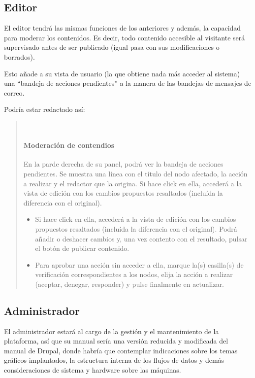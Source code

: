 \subsection{Editor}
\par El editor tendrá las mismas funciones de los anteriores y además, la capacidad para moderar los contenidos. Es decir, todo contenido accesible al visitante será supervisado antes de ser publicado (igual pasa con sus modificaciones o borrados).
\par Esto añade a su vista de usuario (la que obtiene nada más acceder al sistema) una ``bandeja de acciones pendientes'' a la manera de las bandejas de mensajes de correo.
\par Podría estar redactado así:
\begin{quotation}
 ~\paragraph{Moderación de contendios}
  \par En la parde derecha de su panel, podrá ver la bandeja de acciones pendientes. Se muestra una línea con el título del nodo afectado, la acción a realizar y el redactor que la origina.
Si hace click en ella, accederá a la vista de edición con los cambios propuestos resaltados (incluída la diferencia con el original).
\begin{itemize}
 \item Si hace click en ella, accederá a la vista de edición con los cambios propuestos resaltados (incluída la diferencia con el original). Podrá añadir o deshacer cambios y, una vez contento con el resultado, pulsar el botón de publicar contenido.
  \item Para aprobar una acción sin acceder a ella, marque la(s) casilla(s) de verificación correspondientes a los nodos, elija la acción a realizar (aceptar, denegar, responder) y pulse finalmente en actualizar.
\end{itemize}
\end{quotation}


\subsection{Administrador}
\par El administrador estará al cargo de la gestión y el mantenimiento de la plataforma, así que su manual sería una versión reducida y modificada del manual de Drupal, donde habría que contemplar indicaciones sobre los temas gráficos implantados, la estructura interna de los flujos de datos y demás consideraciones de sistema y hardware sobre las máquinas.